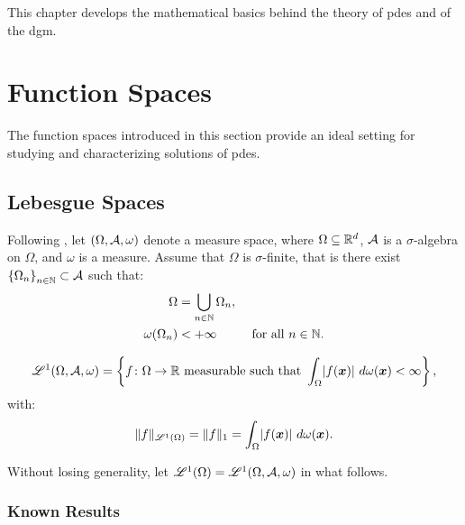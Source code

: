 This chapter develops the mathematical basics behind the theory of \acrlong{pdes} and of the \acrlong{dgm}.

\section{Function Spaces}

The function spaces introduced in this section provide an ideal setting for studying and characterizing solutions of \acrshort{pdes}.

\subsection{Lebesgue Spaces} \label{subsection:lebesgue}

Following \cite[p.~89]{Brezis2010}, let $(\Omega, \mathcal{A}, \omega)$ denote a measure space, where $\Omega \subseteq \mathbb{R}^{d}$, $\mathcal{A}$ is a $\sigma$-algebra on $\Omega$, and $\omega$ is a measure. Assume that $\Omega$ is $\sigma$-finite, that is there exist $\left\{ \Omega_n \right\}_{n \in \mathbb{N}} \subset \mathcal{A}$ such that:
\begin{align}
    \Omega & = \bigcup_{n \in \mathbb{N}} \Omega_n, \\
    \omega(\Omega_n) & < +\infty &\text{ for all } n \in \mathbb{N}.
\end{align}

\begin{definition}
    \begin{align}
        \mathscr{L}^{1}(\Omega, \mathcal{A}, \omega) = \left\{ f \colon \Omega \rightarrow \mathbb{R} \text{ measurable such that } \int_{\Omega} \lvert f(\bm{x}) \rvert ~ d \omega(\bm{x}) < \infty \right\},
    \end{align}
    with:
    \begin{align}
    \lVert f \rVert_{\mathscr{L}^{1}(\Omega)} = \lVert f \rVert_{1} = \int_{\Omega} \lvert f(\bm{x}) \rvert ~ d \omega(\bm{x}).
    \end{align}
\end{definition}

Without losing generality, let $\mathscr{L}^{1}(\Omega) = \mathscr{L}^{1}(\Omega, \mathcal{A}, \omega)$ in what follows.

\subsubsection{Known Results}

